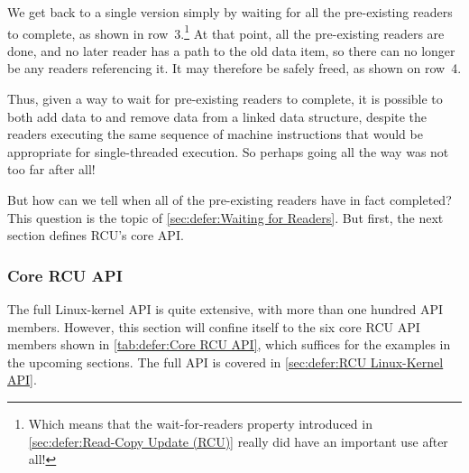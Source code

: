 We get back to a single version simply by waiting for all the
pre-existing readers to complete, as shown in row~3.\footnote{
	Which means that the wait-for-readers property introduced in
	\cref{sec:defer:Read-Copy Update (RCU)}
	really did have an important use after all!}
At that point, all the pre-existing readers are done, and no later
reader has a path to the old data item, so there can no longer be
any readers referencing it.
It may therefore be safely freed, as shown on row~4.

Thus, given a way to wait for pre-existing readers to complete,
it is possible to both add data to and remove data from a linked
data structure, despite the readers executing the same sequence
of machine instructions that would be appropriate for single-threaded
execution.
So perhaps going all the way was not too far after all!

But how can we tell when all of the pre-existing readers have in
fact completed?
This question is the topic of \cref{sec:defer:Waiting for Readers}.
But first, the next section defines RCU's core API.

\subsubsection{Core RCU API}
\label{sec:defer:Core RCU API}

The full Linux-kernel API is quite extensive, with more than one
hundred API members.
However, this section will confine itself to the six core RCU API members
shown in
\cref{tab:defer:Core RCU API},
which suffices for the examples in the upcoming sections.
The full API is covered in \cref{sec:defer:RCU Linux-Kernel API}.

\begin{table}[tb]
\renewcommand*{\arraystretch}{1.25}
\small
\centering
{}
\caption{Core RCU API}
\label{tab:defer:Core RCU API}
\end{table}

